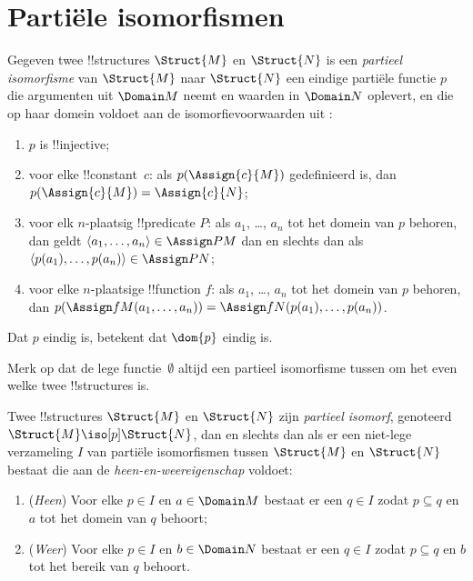 \documentclass[../../../include/open-logic-section]{subfiles}
\begin{document}
\section{Partiële isomorfismen}

\begin{defn}
  Gegeven twee !!{structure}s $\Struct{M}$ en $\Struct{N}$ is een
  \emph{partieel isomorfisme} van $\Struct{M}$ naar $\Struct{N}$ een
  eindige partiële functie $p$ die argumenten uit $\Domain M$ neemt en
  waarden in $\Domain N$ oplevert, en die op haar domein voldoet aan de
  isomorfievoorwaarden uit :
  \begin{enumerate}
  \item $p$ is !!{injective};
  \item voor elke !!{constant}~$c$: als $p(\Assign{c}{M})$ gedefinieerd is,
    dan $p(\Assign{c}{M}) = \Assign{c}{N}$;
  \item voor elk $n$-plaatsig !!{predicate} $P$: als $a_1$, \dots, $a_n$
    tot het domein van $p$ behoren, dan geldt $\langle a_1, \dots, a_n\rangle \in
    \Assign P M$ dan en slechts dan als $\langle p(a_1), \dots, p(a_n) \rangle
    \in \Assign P N$;
  \item voor elke $n$-plaatsige !!{function} $f$: als $a_1$, \dots, $a_n$
    tot het domein van $p$ behoren, dan $p(\Assign f M (a_1, \dots,a_n))
    = \Assign f N (p(a_1), \dots, p(a_n))$.
  \end{enumerate}
  Dat $p$ eindig is, betekent dat $\dom{p}$ eindig is.
\end{defn}

Merk op dat de lege functie~$\emptyset$ altijd een partieel
isomorfisme tussen om het even welke twee !!{structure}s is.

\begin{defn}
  Twee !!{structure}s $\Struct{M}$ en $\Struct{N}$ zijn
  \emph{partieel isomorf}, genoteerd $\Struct{M} \iso[p]
  \Struct{N}$, dan en slechts dan als er een niet-lege verzameling $I$
  van partiële isomorfismen tussen $\Struct{M}$ en $\Struct{N}$ bestaat
  die aan de \emph{heen-en-weereigenschap} voldoet:
  \begin{enumerate}
  \item (\emph{Heen}) Voor elke $p \in I$ en $a \in \Domain M$
    bestaat er een $q \in I$ zodat $p \subseteq q$ en $a$
    tot het domein van $q$ behoort;
  \item (\emph{Weer}) Voor elke $p \in I$ en $b \in \Domain N$
    bestaat er een $q \in I$ zodat $p \subseteq q$ en $b$
    tot het bereik van $q$ behoort.
  \end{enumerate}
\end{defn}
\end{document}
